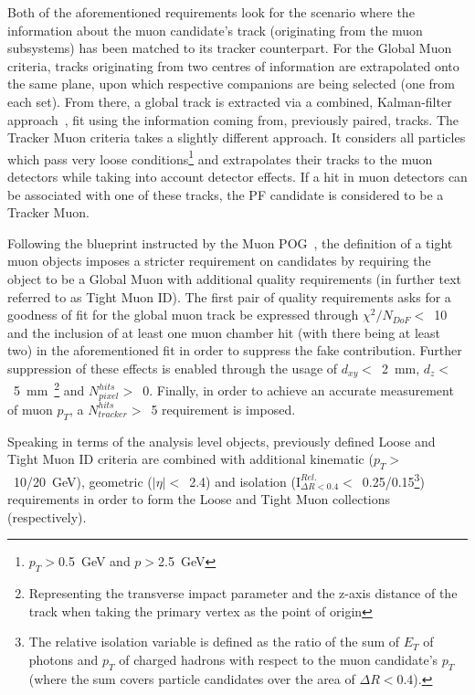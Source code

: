 \hspace{10pt} Both of the aforementioned requirements look for the scenario where the information about the muon candidate's track (originating from the muon subsystems) has been matched to its tracker counterpart. For the Global Muon criteria, tracks originating from two centres of information are extrapolated onto the same plane, upon which respective companions are being selected (one from each set). From there, a global track is extracted via a combined, Kalman-filter approach~\cite{pf:kalman}, fit using the information coming from, previously paired, tracks. The Tracker Muon criteria takes a slightly different approach. It considers all particles which pass very loose conditions\footnote{$p_T>$0.5~GeV and $p>$2.5~GeV} and extrapolates their tracks to the muon detectors while taking into account detector effects. If a hit in muon detectors can be associated with one of these tracks, the PF candidate is considered to be a Tracker Muon.

\hspace{10pt} Following the blueprint instructed by the Muon POG~\cite{muon_pog_1}, the definition of a tight muon objects imposes a stricter requirement on candidates by requiring the object to be a Global Muon with additional quality requirements (in further text referred to as Tight Muon ID). The first pair of quality requirements asks for a goodness of fit for the global muon track be expressed through $\chi^2/N_{DoF}<$~10 and the inclusion of at least one muon chamber hit (with there being at least two) in the aforementioned fit in order to suppress the fake contribution. Further suppression of these effects is enabled through the usage of $d_{xy}<$~2~mm, $d_z<$~5~mm~\footnote{Representing the transverse impact parameter and the z-axis distance of the track when taking the primary vertex as the point of origin} and $N^{hits}_{pixel}>$~0. Finally, in order to achieve an accurate measurement of muon $p_T$, a $N_{tracker}^{hits}>$~5 requirement is imposed. 

\hspace{10pt} Speaking in terms of the analysis level objects, previously defined Loose and Tight Muon ID criteria are combined with additional kinematic ($p_T>$~10/20~GeV), geometric ($|\eta|<$~2.4) and isolation ($\text{I}_{\Delta R<0.4}^{Rel.}<$~0.25/0.15\footnote{The relative isolation variable is defined as the ratio of the sum of $E_T$ of photons and $p_T$ of charged hadrons with respect to the muon candidate’s $p_T$ (where the sum covers particle candidates over the area of $\Delta R<0.4$).}) requirements in order to form the Loose and Tight Muon collections (respectively).

